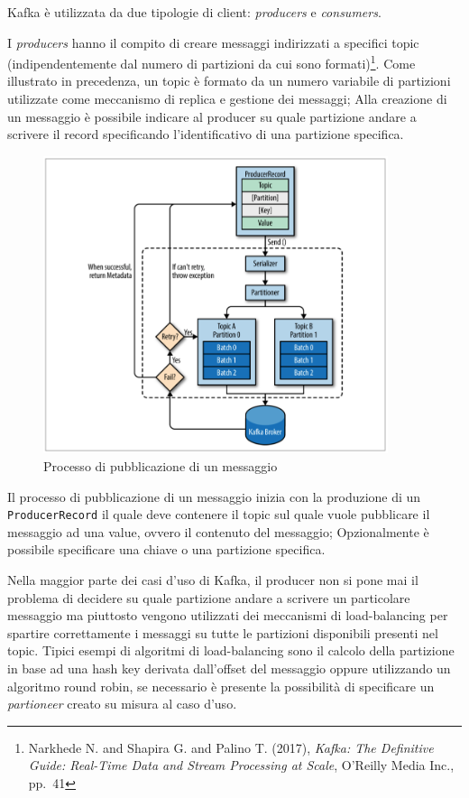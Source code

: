 \documentclass[]{article}
\begin{document}
Kafka è utilizzata da due tipologie di client: \emph{producers} e
\emph{consumers}.

I \emph{producers} hanno il compito di creare messaggi indirizzati a
specifici topic (indipendentemente dal numero di partizioni da cui sono
formati)\footnote{Narkhede N. and Shapira G. and Palino T. (2017),
  \emph{Kafka: The Definitive Guide: Real-Time Data and Stream
  Processing at Scale}, O'Reilly Media Inc., pp.~41}. Come illustrato in
precedenza, un topic è formato da un numero variabile di partizioni
utilizzate come meccanismo di replica e gestione dei messaggi; Alla
creazione di un messaggio è possibile indicare al producer su quale
partizione andare a scrivere il record specificando l'identificativo di
una partizione specifica.

\begin{figure}
\centering
\includegraphics[width=0.90000\textwidth]{../images/producer-process.png}
\caption{Processo di pubblicazione di un messaggio \label{figure_3}}
\end{figure}

Il processo di pubblicazione di un messaggio inizia con la produzione di
un \texttt{ProducerRecord} il quale deve contenere il topic sul quale
vuole pubblicare il messaggio ad una value, ovvero il contenuto del
messaggio; Opzionalmente è possibile specificare una chiave o una
partizione specifica.

Nella maggior parte dei casi d'uso di Kafka, il producer non si pone mai
il problema di decidere su quale partizione andare a scrivere un
particolare messaggio ma piuttosto vengono utilizzati dei meccanismi di
load-balancing per spartire correttamente i messaggi su tutte le
partizioni disponibili presenti nel topic. Tipici esempi di algoritmi di
load-balancing sono il calcolo della partizione in base ad una hash key
derivata dall'offset del messaggio oppure utilizzando un algoritmo round
robin, se necessario è presente la possibilità di specificare un
\emph{partioneer} creato su misura al caso d'uso.
\end{document}
